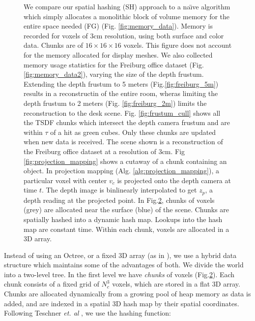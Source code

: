 \documentclass[10pt,twocolumn,letterpaper]{article}
\newcommand{\figref}[1]{Fig.\ref{#1}}
\begin{document}
\begin{figure}
\begin{minipage}{0.23\linewidth}
\begin{subfigure}{\linewidth}
 	      \caption{}
 	  	\label{fig:chunks} 
 	  \end{subfigure} 
   \end{minipage}
  \caption{ We compare our spatial hashing (SH)
      approach to a na\"{\i}ve algorithm which simply allocates a monolithic
      block of volume memory for the entire space needed (FG) (Fig.
      \ref{fig:memory_data}).
      Memory is recorded for voxels of 3cm resolution, using both surface and
      color data. Chunks are of $16 \times 16 \times 16$ voxels. This figure
      does not account for the memory allocated for display meshes. We also collected memory
      usage statistics for the Freiburg \cite{FREIBURG} office dataset (Fig.
      \ref{fig:memory_data2}), varying the size of the depth frustum. Extending
      the depth frustum to 5 meters (\figref{fig:freiburg_5m}) results in a reconstructin of the entire
      room, wheras limiting the depth frustum to 2 meters (Fig.
      \ref{fig:freiburg_2m}) limits the reconstruction to the desk scene. Fig.
      \ref{fig:frustum_cull} shows all the TSDF chunks which intersect the depth camera frustum  and are within $\tau$ of a hit as green cubes. Only these
      chunks are updated when new data is received. The scene shown is a
      reconstruction of the Freiburg office \cite{FREIBURG} dataset at a
      resolution of 3cm. Fig \ref{fig:projection_mapping} shows a cutaway of a
      chunk containing an object. In projection mapping (Alg. \ref{alg:projection_mapping}),  a particular voxel with
      center $v_c$ is projected onto the depth camera at time $t$. The depth image is binlinearly interpolated to get
      $z_p$, a depth reading at the projected point. In \figref{fig:chunks}, chunks of voxels (grey) are allocated near
  the surface (blue) of the scene. Chunks are spatially hashed \cite{SpatialHashing} into a
      dynamic hash map. Lookups into the hash map are constant time. Within each
      chunk, voxels are allocated in a 3D array.}
\end{figure} 

Instead of using an Octree, or a fixed 3D array (as in \cite{Newcombe,
Whelan2013}), we use a hybrid data structure which maintains some of the
advantages of both. We divide the world into a two-level tree. In the first
level we have \emph{chunks} of voxels (\figref{fig:chunks}). Each chunk consists of a
fixed grid of $N_c^3$ voxels, which are stored in a flat 3D array. Chunks are
allocated dynamically from a growing pool of heap memory as data is added, and
are indexed in a spatial 3D hash map \cite{SpatialHashing} by their spatial
coordinates. Following Teschner \emph{et. al} \cite{SpatialHashing}, we use the
hashing function:
\end{document}

